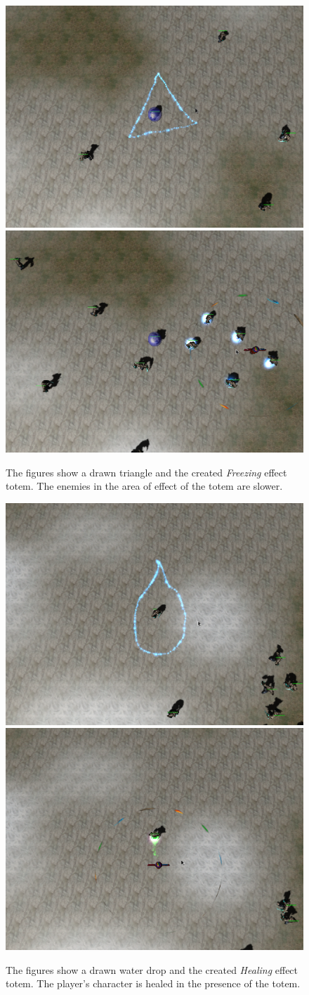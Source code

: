 \begin{figure}[p]
\centering
\includegraphics[width=.47\linewidth]{ext/scr/triangle.png}
\quad
\includegraphics[width=.47\linewidth]{ext/scr/trianglee.png}
\caption{The figures show a drawn triangle and the created \emph{Freezing} effect totem. The enemies in the area of effect of the totem are slower.}
\label{fig:spell:triangle}
\end{figure}

\begin{figure}[p]
\centering
\includegraphics[width=.47\linewidth]{ext/scr/waterDrop.png}
\quad
\includegraphics[width=.47\linewidth]{ext/scr/waterDrope.png}
\caption{The figures show a drawn water drop and the created \emph{Healing} effect totem. The player's character is healed in the presence of the totem.}
\label{fig:spell:waterDrop}
\end{figure}

